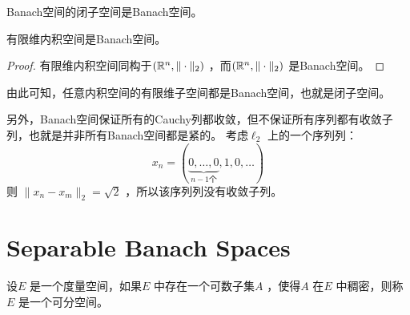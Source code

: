\begin{theorem}
    Banach空间的闭子空间是Banach空间。
\end{theorem}

\begin{theorem}
    有限维内积空间是Banach空间。
\end{theorem}

\begin{proof}
    有限维内积空间同构于\((\mathbb{R}^{n} , \|\cdot\|_{2})\) ，而\((\mathbb{R}^{n} ,
    \|\cdot\|_{2})\) 是Banach空间。
\end{proof}

由此可知，任意内积空间的有限维子空间都是Banach空间，也就是闭子空间。

另外，Banach空间保证所有的Cauchy列都收敛，但不保证所有序列都有收敛子列，也就是并非所有Banach空间都是紧的。
考虑\(\ell_{2}\) 上的一个序列列：
\[
    x_{n} = (\underbrace{0,\ldots,0}_{n-1\text{个}} ,1,0,\ldots )
\]
则  \(\|x_{n}-x_{m}\|_{2} = \sqrt{2}\) ，所以该序列列没有收敛子列。

\section{Separable Banach Spaces}
\begin{definition}[可分空间]
    设\(E\) 是一个度量空间，如果\(E\) 中存在一个可数子集\(A\) ，使得\(A\) 在\(E\) 中稠密，则称\(E\) 是一个可分空间。
\end{definition}

